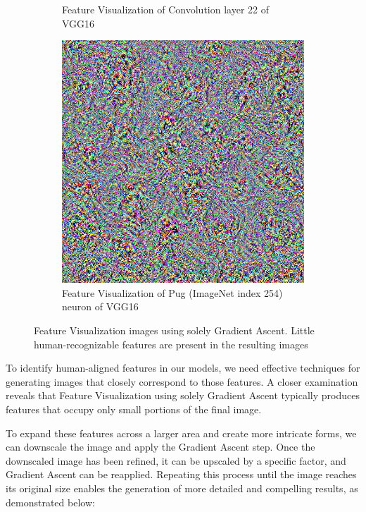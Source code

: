 \begin{figure}
\begin{subfigure}[t]{0.28\textwidth}
        \caption{Feature Visualization of Convolution layer 22 of VGG16}
    \end{subfigure}
    \hfill
    \begin{subfigure}[t]{0.28\textwidth}
        \captionsetup{justification=centering}
        \centering
        \includegraphics[width=.7\linewidth]{figuras/random_image_dream_class_254.png}
        \caption{Feature Visualization of Pug (ImageNet index 254) neuron of VGG16}
    \end{subfigure}

    \caption{
        Feature Visualization images using solely Gradient Ascent. 
    Little human-recognizable features are present in the resulting images
    }
\end{figure}

To identify human-aligned features in our models, we need effective techniques for generating images that closely correspond to those features. 
A closer examination reveals that Feature Visualization using solely Gradient Ascent typically produces features that occupy only small portions of the final image.

To expand these features across a larger area and create more intricate forms, we can downscale the image and apply the Gradient Ascent step. 
Once the downscaled image has been refined, it can be upscaled by a specific factor, and Gradient Ascent can be reapplied. 
\newpage
\noindent
Repeating this process until the image reaches its original size enables the generation of more detailed and compelling results, as demonstrated below:

